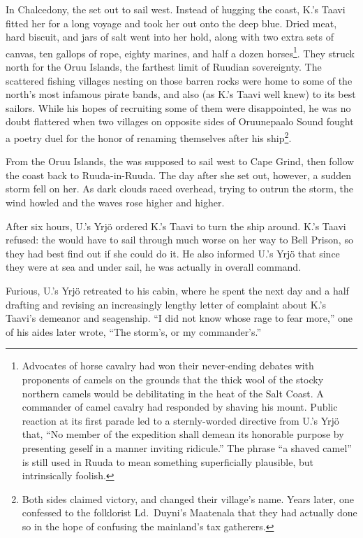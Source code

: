 \documentclass[12pt]{report}
\begin{document}
In Chalcedony, the  set out to sail west.
Instead of hugging the coast, K.'s Taavi fitted her for a long voyage
and took her out onto the deep blue.  Dried meat, hard biscuit, and
jars of salt went into her hold, along with two extra sets of canvas,
ten gallops of rope, eighty marines, and half a dozen
horses\footnote{Advocates of horse cavalry had won their never-ending
debates with proponents of camels on the grounds that the thick wool
of the stocky northern camels would be debilitating in the heat of the
Salt Coast.  A commander of camel cavalry had responded by shaving his
mount.  Public reaction at its first parade led to a sternly-worded
directive from U.'s Yrj\"{o} that, ``No member of the expedition shall
demean its honorable purpose by presenting geself in a manner inviting
ridicule.''  The phrase ``a shaved camel'' is still used in Ruuda to mean
something superficially plausible, but intrinsically foolish.}.  They
struck north for the {\/O}ruu Islands, the farthest limit of Ruudian
sovereignty.  The scattered fishing villages nesting on those barren
rocks were home to some of the north's most infamous pirate bands, and
also (as K.'s Taavi well knew) to its best sailors.  While his hopes
of recruiting some of them were disappointed, he was no doubt
flattered when two villages on opposite sides of {\/O}ruunepaalo Sound
fought a poetry duel for the honor of renaming themselves after his
ship\footnote{Both sides claimed victory, and changed their village's
name.  Years later, one confessed to the folklorist Ld.\ Duyni's
Maatenala that they had actually done so in the hope of confusing the
mainland's tax gatherers.}.

From the {\/O}ruu Islands, the  was supposed to
sail west to Cape Grind, then follow the coast back to Ruuda-in-Ruuda.
The day after she set out, however, a sudden storm fell on her.  As
dark clouds raced overhead, trying to outrun the storm, the wind
howled and the waves rose higher and higher.

After six hours, U.'s Yrj\"{o} ordered K.'s Taavi to turn the ship
around.  K.'s Taavi refused: the  would have to
sail through much worse on her way to Bell Prison, so they had best
find out if she could do it.  He also informed U.'s Yrj\"{o} that
since they were at sea and under sail, he was actually in overall
command.

Furious, U.'s Yrj\"{o} retreated to his cabin, where he spent the next
day and a half drafting and revising an increasingly lengthy letter of
complaint about K.'s Taavi's demeanor and seagenship.  ``I did not know
whose rage to fear more,'' one of his aides later wrote, ``The storm's,
or my commander's.''
\end{document}
